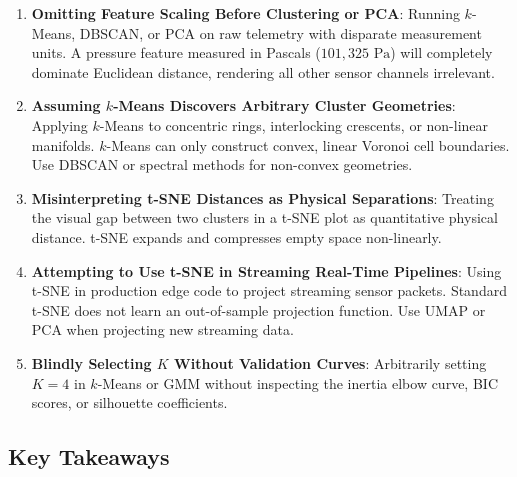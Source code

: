 \begin{warning}
\begin{enumerate}
    \item \textbf{Omitting Feature Scaling Before Clustering or PCA}:
    Running $k$-Means, DBSCAN, or PCA on raw telemetry with disparate measurement units. A pressure feature measured in Pascals ($101{,}325\text{ Pa}$) will completely dominate Euclidean distance, rendering all other sensor channels irrelevant.

    \item \textbf{Assuming $k$-Means Discovers Arbitrary Cluster Geometries}:
    Applying $k$-Means to concentric rings, interlocking crescents, or non-linear manifolds. $k$-Means can only construct convex, linear Voronoi cell boundaries. Use DBSCAN or spectral methods for non-convex geometries.

    \item \textbf{Misinterpreting t-SNE Distances as Physical Separations}:
    Treating the visual gap between two clusters in a t-SNE plot as quantitative physical distance. t-SNE expands and compresses empty space non-linearly.

    \item \textbf{Attempting to Use t-SNE in Streaming Real-Time Pipelines}:
    Using t-SNE in production edge code to project streaming sensor packets. Standard t-SNE does not learn an out-of-sample projection function. Use UMAP or PCA when projecting new streaming data.

    \item \textbf{Blindly Selecting $K$ Without Validation Curves}:
    Arbitrarily setting $K = 4$ in $k$-Means or GMM without inspecting the inertia elbow curve, BIC scores, or silhouette coefficients.
\end{enumerate}
\end{warning}

\subsection{Key Takeaways}\label{subsec:unsupervised_takeaways}

